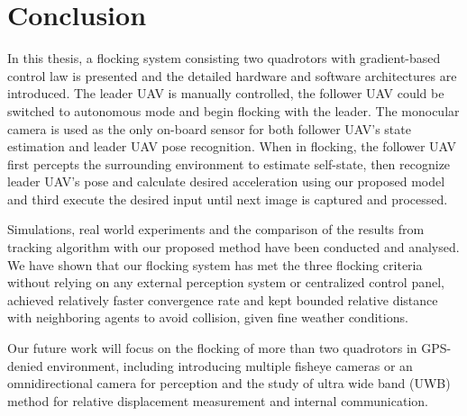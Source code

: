 \chapter{Conclusion}\label{conclusion}

In this thesis, a flocking system consisting two quadrotors with gradient-based control law is presented and the detailed hardware and software architectures are introduced. The leader UAV is manually controlled, the follower UAV could be switched to autonomous mode and begin flocking with the leader. The monocular camera is used as the only on-board sensor for both follower UAV's state estimation and leader UAV pose recognition. When in flocking, the follower UAV first percepts the surrounding environment to estimate self-state, then recognize leader UAV's pose and calculate desired acceleration using our proposed model and third execute the desired input until next image is captured and processed.

Simulations, real world experiments and the comparison of the results from tracking algorithm with our proposed method have been conducted and analysed. We have shown that our flocking system has met the three flocking criteria without relying on any external perception system or centralized control panel, achieved relatively faster convergence rate and kept bounded relative distance with neighboring agents to avoid collision, given fine weather conditions.

Our future work will focus on the flocking of more than two quadrotors in GPS-denied environment, including introducing multiple fisheye cameras or an omnidirectional camera for perception and the study of ultra wide band (UWB) method for relative displacement measurement and internal communication.
